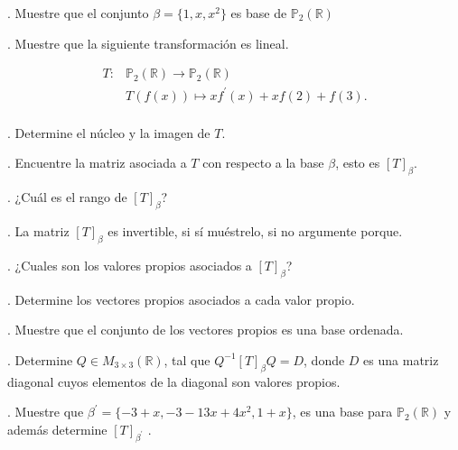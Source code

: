 \documentclass[letterpaper]{article}
\renewcommand{\*}{\cdot}
\theoremstyle{definition}
\begin{document}
. Muestre que el conjunto  $\beta =  \{ 1, x , x^2 \}$ es base de $ \mathbb{P}_{2}(\mathbb{R})$

. Muestre que la siguiente transformación es lineal.

\begin{align*}
     T \colon & \mathbb{P}_{2}(\mathbb{R})  \longrightarrow \mathbb{P}_{2}(\mathbb{R}) \\
     & T(f(x)) \mapsto  xf^{'}(x) +x f(2) + f(3). \\
 \end{align*}

. Determine el núcleo y la imagen de $T$.

. Encuentre la matriz asociada a $T$ con respecto a la base $\beta$, esto es $[T]_{\beta}$.

. ¿Cuál es el rango de $[T]_{\beta}$?

. La matriz $[T]_{\beta}$ es invertible, si sí muéstrelo, si no argumente porque.

. ¿Cuales son los valores propios asociados a $[T]_{\beta}$?

. Determine los vectores propios asociados a cada valor propio. 

. Muestre que el conjunto de los vectores propios es una base ordenada.

. Determine $Q \in M_{3\times 3}(\mathbb{R})$, tal que $Q^{-1}[T]_{\beta} Q = D$, donde $D$ es una matriz diagonal cuyos elementos de la diagonal son valores propios.

. Muestre que $\beta^{'} =\{ -3+x , -3-13x + 4x^2, 1+x \}$, es una base para $ \mathbb{P}_{2}(\mathbb{R})$ y además determine $[T]_{\beta^{'}}$ .
\end{document}

